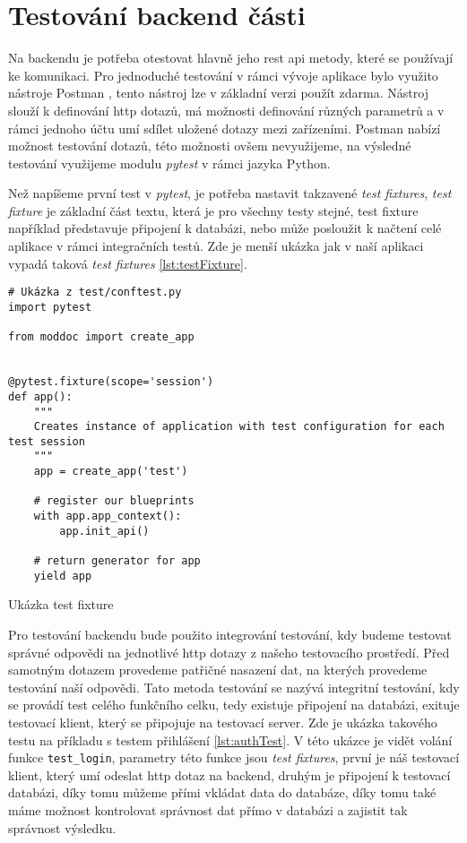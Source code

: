 \section{Testování backend části}

Na backendu je potřeba otestovat hlavně jeho \gls{rest} \gls{api} metody, které se používají ke komunikaci. Pro jednoduché
testování v rámci vývoje aplikace bylo využito nástroje Postman \cite{postmanSW}, tento nástroj lze v základní verzi použít
zdarma. Nástroj slouží k definování \gls{http} dotazů, má možnosti definování různých parametrů a v rámci jednoho účtu umí sdílet
uložené dotazy mezi zařízeními. Postman nabízí možnost testování dotazů, této možnosti ovšem nevyužijeme, na výsledné testování
využijeme modulu \textit{pytest} v rámci jazyka Python.

Než napíšeme první test v \textit{pytest}, je potřeba nastavit takzavené \textit{test fixtures}, \textit{test fixture} je základní část
textu, která je pro všechny testy stejné, test fixture například představuje připojení k databázi, nebo může posloužit k načtení
celé aplikace v rámci integračních testů. Zde je menší ukázka jak v naší aplikaci vypadá taková \textit{test fixtures} \ref{lst:testFixture}.

\begin{listing}[H]
    \begin{verbatim}
# Ukázka z test/conftest.py
import pytest

from moddoc import create_app


@pytest.fixture(scope='session')
def app():
    """
    Creates instance of application with test configuration for each test session
    """
    app = create_app('test')

    # register our blueprints
    with app.app_context():
        app.init_api()

    # return generator for app
    yield app
    \end{verbatim}
    \caption{Ukázka test fixture}
    \label{lst:testFixture}
\end{listing}

Pro testování backendu bude použito integrování testování, kdy budeme testovat správné odpovědi na jednotlivé \gls{http} dotazy z našeho
testovacího prostředí. Před samotným dotazem provedeme patřičné nasazení dat, na kterých provedeme testování naší odpovědi. Tato metoda
testování se nazývá integritní testování, kdy se provádí test celého funkčního celku, tedy existuje připojení na databázi, exituje testovací
klient, který se připojuje na testovací server. Zde je ukázka takového testu na příkladu s testem přihlášení \ref{lst:authTest}. V této ukázce
je vidět volání funkce \texttt{test\_login}, parametry této funkce jsou \textit{test fixtures}, první je náš testovací klient, který umí odeslat
\gls{http} dotaz na backend, druhým je připojení k testovací databázi, díky tomu můžeme přími vkládat data do databáze, díky tomu také máme
možnost kontrolovat správnost dat přímo v databázi a zajistit tak správnost výsledku.

